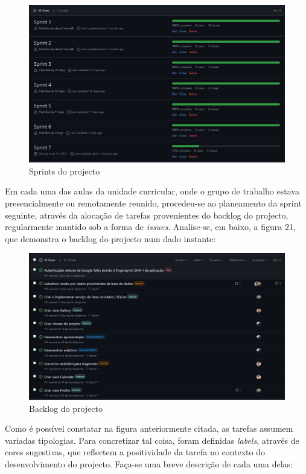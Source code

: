 \documentclass[12pt]{report}
\begin{document}
\bigskip
\begin{figure}[H]
    \centering
    \includegraphics[width=1\textwidth]{sprints.png}
    \caption{Sprints do projecto}
\end{figure}

Em cada uma das aulas da unidade curricular, onde o grupo de trabalho estava presencialmente ou remotamente reunido, procedeu-se ao planeamento da \gls{sprint} seguinte, através da alocação de tarefas provenientes do \gls{backlog} do projecto, regularmente mantido sob a forma de \textit{issues}. Analise-se, em baixo, a figura 21, que demonstra o \gls{backlog} do projecto num dado instante:

\bigskip
\begin{figure}[H]
    \centering
    \includegraphics[width=1\textwidth]{backlog.png}
    \caption{Backlog do projecto}
\end{figure}

Como é possível constatar na figura anteriormente citada, as tarefas assumem variadas tipologias. Para concretizar tal coisa, foram definidas \textit{labels}, através de cores sugestivas, que reflectem a positividade da tarefa no contexto do desenvolvimento do projecto. Faça-se uma breve descrição de cada uma delas:
\end{document}
